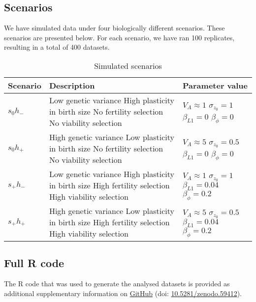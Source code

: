 \subsection{Scenarios} \label{app:scenarios}
We have simulated data under four biologically different scenarios. These scenarios are presented below. For each scenario, we have ran 100 replicates, resulting in a total of 400 datasets.
\begin{table}[ht]
\centering
\caption{Simulated scenarios} 
\label{coeff}
\begin{tabularx}{\textwidth}{lXX}
  \hline
Scenario & Description & Parameter value \\ 
  \hline
$s_0h_-$ & Low genetic variance \newline High plasticity in birth size \newline No fertility selection \newline No viability selection & $V_A \approx 1$ \newline $\sigma_{z_0}=1$ \newline $\beta_{L1}=0$ \newline $\beta_{\phi}=0$  \\ \hline
$s_0h_+$ & High genetic variance \newline Low plasticity in birth size \newline No fertility selection \newline No viability selection& $V_A \approx 5$  \newline $\sigma_{z_0}=0.5$ \newline $\beta_{L1}=0$ \newline $\beta_{\phi}=0$ \\ \hline
$s_+h_-$ & Low genetic variance \newline High plasticity in birth size \newline High fertility selection \newline High viability selection& $V_A \approx 1$ \newline $\sigma_{z_0}=1$ \newline $\beta_{L1}=0.04$ \newline $\beta_{\phi}=0.2$ \\ \hline
$s_+h_+$ & High genetic variance \newline Low plasticity in birth size \newline High fertility selection \newline High viability selection& $V_A \approx 5$  \newline $\sigma_{z_0}=0.5$ \newline $\beta_{L1}=0.04$ \newline $\beta_{\phi}=0.2$ \\ 
  \hline
\end{tabularx}
\end{table}

\subsection{Full R code}
The R code that was used to generate the analysed datasets is provided as additional supplementary information on \href{https://github.com/koenvanbenthem/Disentangling_Dynamics_IBM}{GitHub} (doi: \href{https://doi.org/10.5281/zenodo.59412}{10.5281/zenodo.59412}).